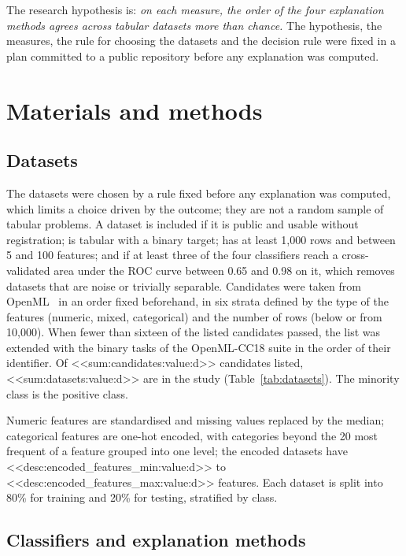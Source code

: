 \documentclass[10pt,a4paper,twocolumn]{article}
\begin{document}
The research hypothesis is: \textit{on each measure, the order of the four explanation
methods agrees across tabular datasets more than chance.} The hypothesis, the measures,
the rule for choosing the datasets and the decision rule were fixed in a plan committed
to a public repository before any explanation was computed.

\section{Materials and methods}

\subsection{Datasets}

The datasets were chosen by a rule fixed before any explanation was computed, which
limits a choice driven by the outcome; they are not a random sample of tabular problems.
A dataset is included if it is public and usable without registration; is
tabular with a binary target; has at least 1,000 rows and between 5 and 100 features; and
if at least three of the four classifiers reach a cross-validated area under the ROC
curve between 0.65 and 0.98 on it, which removes datasets that are noise or trivially
separable. Candidates were taken from OpenML~\cite{vanschoren2014openml} in an order
fixed beforehand, in six strata defined by the type of the features (numeric, mixed,
categorical) and the number of rows (below or from 10,000).
When fewer than sixteen of the listed candidates passed, the list was extended with the
binary tasks of the OpenML-CC18 suite in the order of their identifier. Of
<<sum:candidates:value:d>> candidates listed, <<sum:datasets:value:d>> are in the
study (Table~\ref{tab:datasets}). The minority class is the positive class.



Numeric features are standardised and missing values replaced by the median; categorical
features are one-hot encoded, with categories beyond the 20 most frequent of a feature
grouped into one level; the encoded datasets have <<desc:encoded_features_min:value:d>>
to <<desc:encoded_features_max:value:d>> features. Each dataset is split into 80\% for
training and 20\% for testing, stratified by class.

\subsection{Classifiers and explanation methods}
\end{document}
